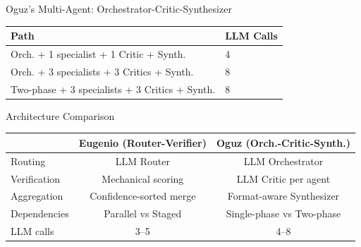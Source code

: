 \documentclass[aspectratio=169]{beamer}
\newcommand{\flowpoint}[1]{\vspace{0.12cm}\par\hangindent=0.5cm\hangafter=1\textbullet\ \textcolor{text}{#1}}
\begin{document}
\begin{frame}{Oguz's Multi-Agent: Orchestrator-Critic-Synthesizer}
    \uncover<1->{\flowpoint{Orchestrator analyzes question, selects specialists, and detects ranking dependencies via structured JSON.}}
    \uncover<2->{\flowpoint{Two execution modes: single-phase (ThreadPoolExecutor) or two-phase when Phase 1 output feeds Phase 2.}}
    \uncover<3->{\flowpoint{LLM Critic (1 call per specialist) checks internal consistency --- do numbers in the answer match the raw tool output?}}
    \uncover<4->{\flowpoint{Synthesizer merges results: table format for multi-ticker comparisons, prose for others.}}
\vspace{0.3em}
\centering
\scriptsize
\begin{tabular}{ll}
\hline
\textbf{Path} & \textbf{LLM Calls} \\
\hline
Orch. + 1 specialist + 1 Critic + Synth. & 4 \\
Orch. + 3 specialists + 3 Critics + Synth. & 8 \\
Two-phase + 3 specialists + 3 Critics + Synth. & 8 \\
\hline
\end{tabular}
\end{frame}

\begin{frame}{Architecture Comparison}
\renewcommand{\arraystretch}{1.3}
\centering
\small
\begin{tabular}{lcc}
\hline
 & \textbf{Eugenio (Router-Verifier)} & \textbf{Oguz (Orch.-Critic-Synth.)} \\
\hline
Routing       & LLM Router              & LLM Orchestrator \\
Verification  & Mechanical scoring       & LLM Critic per agent \\
Aggregation   & Confidence-sorted merge  & Format-aware Synthesizer \\
Dependencies  & Parallel vs Staged       & Single-phase vs Two-phase \\
LLM calls     & 3--5                     & 4--8 \\
\hline
\end{tabular}
\end{frame}
\end{document}
